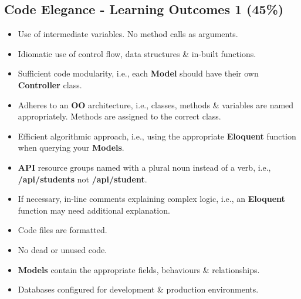 \documentclass{article}
\begin{document}
\subsection*{Code Elegance - Learning Outcomes 1 (45\%)}
\begin{itemize}
	\item Use of intermediate variables. No method calls as arguments.
	\item Idiomatic use of control flow, data structures \& in-built functions.
	\item Sufficient code modularity, i.e., each \textbf{Model} should have their own \textbf{Controller} class.
	\item Adheres to an \textbf{OO} architecture, i.e., classes, methods \& variables are named appropriately. Methods are assigned to the correct class.
	\item Efficient algorithmic approach, i.e., using the appropriate \textbf{Eloquent} function when querying your \textbf{Models}.
	\item \textbf{API} resource groups named with a plural noun instead of a verb, i.e., \textbf{/api/students} not \textbf{/api/student}.
	\item If necessary, in-line comments explaining complex logic, i.e., an \textbf{Eloquent} function may need additional explanation.
	\item Code files are formatted.
	\item No dead or unused code.
	\item \textbf{Models} contain the appropriate fields, behaviours \& relationships.
	\item Databases configured for development \& production environments.
\end{itemize}
\end{document}
